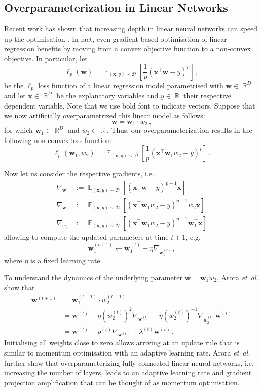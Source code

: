 \documentclass{article}
\DeclareMathOperator*{\E}{\mathbb{E}}
\DeclareMathOperator*{\R}{\mathbb{R}}
\begin{document}
\subsection{Overparameterization in Linear Networks}
Recent work has shown that increasing depth in linear neural networks can speed up the optimisation \cite{Arora2018}. 
In fact, even gradient-based optimisation of linear regression benefits by moving from a convex objective function to a non-convex objective.
In particular, let
\[
\ell_p(\bm w) = \E_{(\bm{x},y) \sim \mathcal{D}} \left[ \frac{1}{p} (\bm x^{\top} \bm w - y)^p \right] \, ,
\]
be the $\ell_p$ loss function of a linear regression model parametrised with $\bm w \in \R^D$ and let $\bm{x} \in \R^D$ be the explanatory variables and $y \in \R$ their respective dependent variable.
Note that we use bold font to indicate vectors.
Suppose that we now artificially overparametrized this linear model as follows:
\[
\bm w = \bm w_1 \cdot w_2 \, ,
\]
for which $\bm w_1 \in \R^D$ and $w_2 \in \R$.
Thus, our overparameterization results in the following non-convex loss function:
\[
\ell_p(\bm w_1, w_2) = \E_{(\bm{x},y) \sim \mathcal{D}} \left[ \frac{1}{p} (\bm x^{\top} \bm w_1 w_2 - y)^p \right] \, .
\]

Now let us consider the respective gradients, i.e. 
\begin{align*}
  \nabla_{\bm w} &:= \E_{(\bm{x},y) \sim \mathcal{D}} \left[ (\bm x^{\top} \bm w - y)^{p-1} \bm x \right] \\
  \nabla_{\bm w_1} &:= \E_{(\bm{x},y) \sim \mathcal{D}} \left[ (\bm x^{\top} \bm w_1 w_2 - y)^{p-1} w_2 \bm x \right] \\
  \nabla_{w_2} &:= \E_{(\bm{x},y) \sim \mathcal{D}} \left[ (\bm x^{\top} \bm w_1 w_2 - y)^{p-1} \bm w_1^{\top} \bm x \right]
\end{align*}
allowing to compute the updated parameters at time $t+1$, e.g.
\[
\bm w^{(t+1)}_1 \leftarrow \bm w^{(t)}_1 - \eta \nabla_{\bm w^{(t)}_1} \, ,
\]
where $\eta$ is a fixed learning rate.

To understand the dynamics of the underlying parameter $\bm w = \bm w_1 w_2$, Arora {\it et~al.} \cite{Arora2018} show that
\begin{align*}
  \bm w^{(t+1)} &= \bm w_1^{(t+1)} \cdot w_2^{(t+1)} \\
   &= \bm w^{(t)} - \eta (w^{(t)}_2)^2 \nabla_{\bm w^{(t)}} - \eta (w^{(t)}_2)^{-1} \nabla_{w^{(t)}_2} \bm w^{(t)} \\
   &= \bm w^{(t)} - \rho^{(t)} \nabla_{\bm w^{(t)}} - \lambda^{(t)} \bm w^{(t)} \, .
\end{align*}
Initialising all weights close to zero allows arriving at an update rule that is similar to momentum optimisation \cite{Nesterov1983} with an adaptive learning rate.
Arora {\it et~al.} further show that overparameterizing fully connected linear neural networks, i.e. increasing the number of layers, leads to an adaptive learning rate and gradient projection amplification that can be thought of as momentum optimisation.
\end{document}
